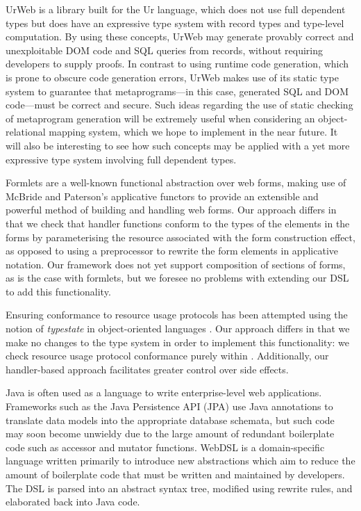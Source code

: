 Ur\/Web \cite{urweb} is a library built for the Ur language, which does not use
full dependent types but does have an expressive type system with 
record types and type-level computation.  By using these concepts,
Ur\/Web may generate provably correct and unexploitable DOM code and SQL
queries from records, without requiring developers to supply proofs.  In
contrast to using runtime code generation, which is prone to obscure code
generation errors, Ur\/Web makes use of its static type system to guarantee
that metaprograms---in this case, generated SQL and DOM code---must be correct
and secure.  Such ideas regarding the use of static checking of metaprogram
generation will be extremely useful when considering an object-relational
mapping system, which we hope to implement in the near future. It will also be
interesting to see how such concepts may be applied with a yet more expressive
type system involving full dependent types.

Formlets \cite{cooper:formlets} are a well-known functional abstraction over web forms, making use of McBride and Paterson's applicative functors \cite{mcbride:applicative} to provide an extensible and powerful method of building and handling web forms. 
Our approach differs in that we check that handler functions conform to the types of the elements in the forms by parameterising the resource associated with the form construction effect, as opposed to using a preprocessor to rewrite the form elements in applicative notation.
Our framework does not yet support composition of sections of forms, as is the case with formlets, but we foresee no problems with extending our DSL to add this functionality.

Ensuring conformance to resource usage protocols has been attempted using the notion of \emph{typestate} in object-oriented languages \cite{deline:typestates}. Our approach differs in that we make no changes to the type system in order to implement this functionality: we check resource usage protocol conformance purely within \idris{}.
Additionally, our handler-based approach facilitates greater control over side effects.

Java is often used as a language to write enterprise-level web applications. Frameworks such as the Java Persistence API (JPA) \cite{jpa} use Java annotations to translate data models into the appropriate database schemata, but such code may soon become unwieldy due to the large amount of redundant boilerplate code such as accessor and mutator functions. WebDSL \cite{webdsl} is a domain-specific language written primarily to
introduce new abstractions which aim to reduce the amount of boilerplate code
that must be written and maintained by developers. 
The DSL is parsed into an abstract syntax tree, modified using rewrite rules, and elaborated back into Java code. 

